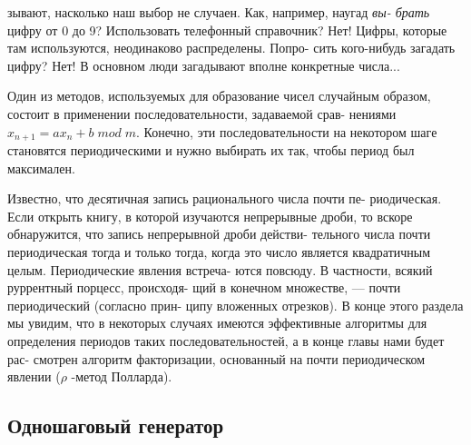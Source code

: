 \noindent зывают, насколько наш выбор не случаен. Как, например, наугад \textit{вы- \linebreak брать} цифру от 0 до 9? Использовать телефонный справочник? Нет! \linebreak Цифры, которые там используются, неодинаково распределены. Попро- \linebreak сить кого-нибудь загадать цифру? Нет! В основном люди загадывают \linebreak вполне конкретные числа... \par 

Один из методов, используемых для образование чисел случайным \linebreak образом, состоит в применении последовательности, задаваемой срав- \linebreak нениями $x_{n+1} = ax_{n} + b \; mod \; m$. Конечно, эти последовательности на \linebreak некотором шаге становятся периодическими и нужно выбирать их так, \linebreak чтобы период был максимален. \par 

Известно, что десятичная запись рационального числа почти пе- \linebreak риодическая. Если открыть книгу, в которой изучаются непрерывные \linebreak дроби, то вскоре обнаружится, что запись непрерывной дроби действи- \linebreak тельного числа почти периодическая тогда и только тогда, когда это \linebreak число является квадратичным целым. Периодические явления встреча- \linebreak ются повсюду. В частности, всякий руррентный порцесс, происходя- \linebreak щий в конечном множестве, --- почти периодический (согласно прин- \linebreak ципу вложенных отрезков). В конце этого раздела мы увидим, что
в \linebreak некоторых случаях имеются эффективные алгоритмы для определения \linebreak периодов таких последовательностей, а в конце главы нами будет рас- \linebreak смотрен алгоритм факторизации, основанный на почти периодическом \linebreak явлении ($\rho$ -метод Полларда). \par

\subsection{Одношаговый генератор}

